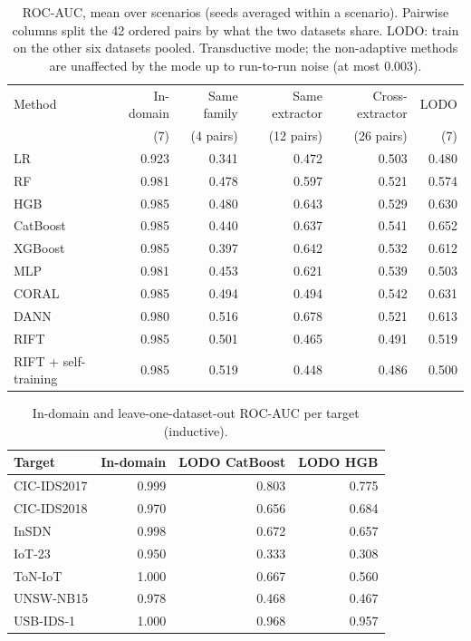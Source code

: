 \documentclass[pdflatex,sn-mathphys-num]{sn-jnl}%
\begin{document}
\begin{table}[htbp]
\centering\small
\caption{ROC-AUC, mean over scenarios (seeds averaged within a scenario). Pairwise columns split the 42 ordered pairs by what the two datasets share. LODO: train on the other six datasets pooled. Transductive mode; the non-adaptive methods are unaffected by the mode up to run-to-run noise (at most 0.003).}\label{tab:main}
{\scriptsize\setlength{\tabcolsep}{2.5pt}\begin{tabular}{lrrrrr}
\toprule
Method & In-domain & Same family & Same extractor & Cross-extractor & LODO \\
 & (7) & (4 pairs) & (12 pairs) & (26 pairs) & (7) \\
\midrule
LR & 0.923 & 0.341 & 0.472 & 0.503 & 0.480 \\
RF & 0.981 & 0.478 & 0.597 & 0.521 & 0.574 \\
HGB & 0.985 & 0.480 & 0.643 & 0.529 & 0.630 \\
CatBoost & 0.985 & 0.440 & 0.637 & 0.541 & 0.652 \\
XGBoost & 0.985 & 0.397 & 0.642 & 0.532 & 0.612 \\
MLP & 0.981 & 0.453 & 0.621 & 0.539 & 0.503 \\
CORAL & 0.985 & 0.494 & 0.494 & 0.542 & 0.631 \\
DANN & 0.980 & 0.516 & 0.678 & 0.521 & 0.613 \\
RIFT & 0.985 & 0.501 & 0.465 & 0.491 & 0.519 \\
RIFT + self-training & 0.985 & 0.519 & 0.448 & 0.486 & 0.500 \\
\bottomrule
\end{tabular}}
\end{table}

\begin{table}[htbp]
\centering\small
\caption{In-domain and leave-one-dataset-out ROC-AUC per target (inductive).}\label{tab:targets}
\begin{tabular}{lrrr}
\toprule
Target & In-domain & LODO CatBoost & LODO HGB \\
\midrule
CIC-IDS2017 & 0.999 & 0.803 & 0.775 \\
CIC-IDS2018 & 0.970 & 0.656 & 0.684 \\
InSDN & 0.998 & 0.672 & 0.657 \\
IoT-23 & 0.950 & 0.333 & 0.308 \\
ToN-IoT & 1.000 & 0.667 & 0.560 \\
UNSW-NB15 & 0.978 & 0.468 & 0.467 \\
USB-IDS-1 & 1.000 & 0.968 & 0.957 \\
\bottomrule
\end{tabular}
\end{table}
\end{document}

